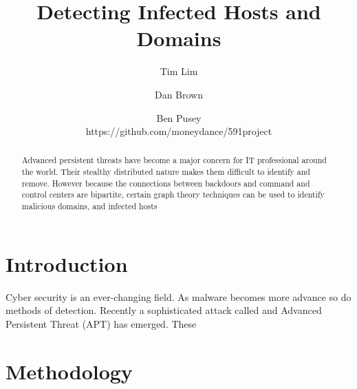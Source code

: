 \documentclass{article} %
\title{Detecting Infected Hosts and Domains}
\author{
Tim  Lim\\
\and
Dan Brown \\
\and
Ben Pusey \\
\AND
https://github.com/moneydance/591project
}
\begin{document}
\maketitle

\begin{abstract}
Advanced persistent threats have become a major concern for IT professional around the world. Their stealthy distributed nature makes them difficult 
to identify and remove. However because the connections between backdoors and command and control centers are bipartite, certain graph theory
techniques can be used to identify malicious domains, and infected hosts
\end{abstract}

\section{Introduction}
Cyber security is an ever-changing field. As malware becomes more advance so do methods of detection. Recently a sophisticated attack called and Advanced Persistent Threat (APT) has emerged. These 







\section{Methodology}
\label{method}
\end{document}
